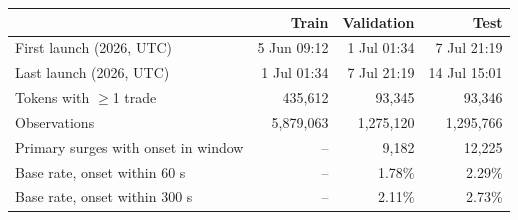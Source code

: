 \begin{tabular}{lrrr}
\toprule
 & Train & Validation & Test \\
\midrule
First launch (2026, UTC) & 5 Jun 09:12 & 1 Jul 01:34 & 7 Jul 21:19 \\
Last launch (2026, UTC) & 1 Jul 01:34 & 7 Jul 21:19 & 14 Jul 15:01 \\
Tokens with $\geq$1 trade & 435{,}612 & 93{,}345 & 93{,}346 \\
Observations & 5{,}879{,}063 & 1{,}275{,}120 & 1{,}295{,}766 \\
Primary surges with onset in window & -- & 9{,}182 & 12{,}225 \\
Base rate, onset within 60 s & -- & 1.78\% & 2.29\% \\
Base rate, onset within 300 s & -- & 2.11\% & 2.73\% \\
\bottomrule
\end{tabular}
